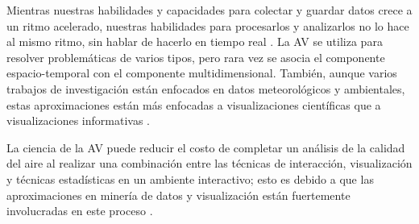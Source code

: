Mientras nuestras habilidades y capacidades para colectar y guardar datos crece a un ritmo acelerado, nuestras habilidades para procesarlos y analizarlos no lo hace al mismo ritmo, sin hablar de hacerlo en tiempo real \citep{Keim2006, Liao2014}. La AV se utiliza para resolver problemáticas de varios tipos, pero rara vez se asocia el componente espacio-temporal con el componente multidimensional. También, aunque varios trabajos de investigación están enfocados en datos meteorológicos y ambientales, estas aproximaciones están más enfocadas a visualizaciones científicas que a visualizaciones informativas \citep{Liao2014}.

La ciencia de la AV puede reducir el costo de completar un análisis de la calidad del aire al realizar una combinación entre las técnicas de interacción, visualización y técnicas estadísticas en un ambiente interactivo; esto es debido a que las aproximaciones en minería de datos y visualización están fuertemente involucradas en este proceso \citep{Du2018}.